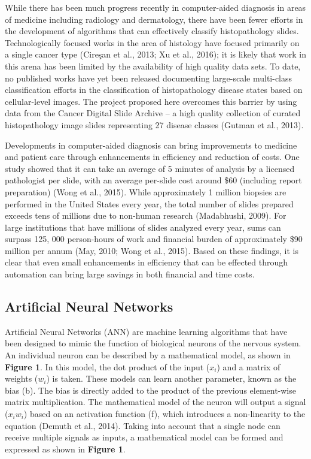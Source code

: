 \documentclass[12pt,]{article}
\begin{document}
While there has been much progress recently in computer-aided diagnosis
in areas of medicine including radiology and dermatology, there have
been fewer efforts in the development of algorithms that can effectively
classify histopathology slides. Technologically focused works in the
area of histology have focused primarily on a single cancer type
(Cireşan et al., 2013; Xu et al., 2016); it is likely that work in this
arena has been limited by the availability of high quality data sets. To
date, no published works have yet been released documenting large-scale
multi-class classification efforts in the classification of
histopathology disease states based on cellular-level images. The
project proposed here overcomes this barrier by using data from the
Cancer Digital Slide Archive -- a high quality collection of curated
histopathology image slides representing 27 disease classes (Gutman et
al., 2013).

Developments in computer-aided diagnosis can bring improvements to
medicine and patient care through enhancements in efficiency and
reduction of costs. One study showed that it can take an average of 5
minutes of analysis by a licensed pathologist per slide, with an average
per-slide cost around \$60 (including report preparation) (Wong et al.,
2015). While approximately 1 million biopsies are performed in the
United States every year, the total number of slides prepared exceeds
tens of millions due to non-human research (Madabhushi, 2009). For large
institutions that have millions of slides analyzed every year, sums can
surpass 125, 000 person-hours of work and financial burden of
approximately \$90 million per annum (May, 2010; Wong et al., 2015).
Based on these findings, it is clear that even small enhancements in
efficiency that can be effected through automation can bring large
savings in both financial and time costs.

\subsection{Artificial Neural
Networks}\label{artificial-neural-networks}

Artificial Neural Networks (ANN) are machine learning algorithms that
have been designed to mimic the function of biological neurons of the
nervous system. An individual neuron can be described by a mathematical
model, as shown in \textbf{Figure 1}. In this model, the dot product of
the input (\(x_i\)) and a matrix of weights (\(w_i\)) is taken. These
models can learn another parameter, known as the bias (b). The bias is
directly added to the product of the previous element-wise matrix
multiplication. The mathematical model of the neuron will output a
signal (\(x_i w_i\)) based on an activation function (f), which
introduces a non-linearity to the equation (Demuth et al., 2014). Taking
into account that a single node can receive multiple signals as inputs,
a mathematical model can be formed and expressed as shown in
\textbf{Figure 1}.
\end{document}
